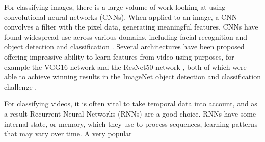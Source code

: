 \documentclass[sigconf]{acmart}
\begin{document}
For classifying images, there is a large volume of work looking at using
convolutional neural networks (CNNs). When applied to an image, a CNN
convolves a filter with the pixel data, generating meaningful features. 
CNNs have found widespread use across various domains, including facial
recognition \cite{lawrence1997face} and object detection and classification
\cite{szegedy2014going}.
Several architectures have been proposed offering impressive ability to learn
features from video using 
purposes, for example the VGG16 network \cite{simonyan2014very} and the
ResNet50 network \cite{he2016deep}, both of which were able to achieve winning results in
the ImageNet object detection and classification challenge \cite{ILSVRC15}.

For classifying videos, it is often vital to take temporal data into account,
and as a result Recurrent Neural Networks (RNNs) \cite{rumelhart1985learning} are a good
choice. RNNs have some internal state, or memory, which they use to process
sequences, learning patterns that may vary over time. A very popular
\end{document}

